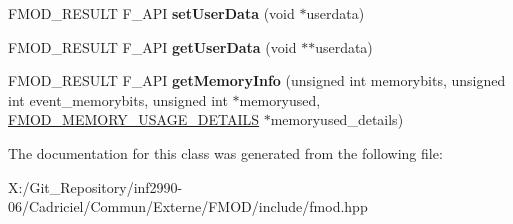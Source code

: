 \begin{DoxyCompactItemize}
\item 
\hypertarget{class_f_m_o_d_1_1_channel_a1ffb34925720c2fcc0afbcab0737df4e}{F\-M\-O\-D\-\_\-\-R\-E\-S\-U\-L\-T F\-\_\-\-A\-P\-I {\bfseries set\-User\-Data} (void $\ast$userdata)}\label{class_f_m_o_d_1_1_channel_a1ffb34925720c2fcc0afbcab0737df4e}

\item 
\hypertarget{class_f_m_o_d_1_1_channel_ab22d259b47802604e61c0e412d7e35f4}{F\-M\-O\-D\-\_\-\-R\-E\-S\-U\-L\-T F\-\_\-\-A\-P\-I {\bfseries get\-User\-Data} (void $\ast$$\ast$userdata)}\label{class_f_m_o_d_1_1_channel_ab22d259b47802604e61c0e412d7e35f4}

\item 
\hypertarget{class_f_m_o_d_1_1_channel_acefe95cb3e5096a5f01f253c2745bad3}{F\-M\-O\-D\-\_\-\-R\-E\-S\-U\-L\-T F\-\_\-\-A\-P\-I {\bfseries get\-Memory\-Info} (unsigned int memorybits, unsigned int event\-\_\-memorybits, unsigned int $\ast$memoryused, \hyperlink{struct_f_m_o_d___m_e_m_o_r_y___u_s_a_g_e___d_e_t_a_i_l_s}{F\-M\-O\-D\-\_\-\-M\-E\-M\-O\-R\-Y\-\_\-\-U\-S\-A\-G\-E\-\_\-\-D\-E\-T\-A\-I\-L\-S} $\ast$memoryused\-\_\-details)}\label{class_f_m_o_d_1_1_channel_acefe95cb3e5096a5f01f253c2745bad3}

\end{DoxyCompactItemize}


The documentation for this class was generated from the following file\-:\begin{DoxyCompactItemize}
\item 
X\-:/\-Git\-\_\-\-Repository/inf2990-\/06/\-Cadriciel/\-Commun/\-Externe/\-F\-M\-O\-D/include/fmod.\-hpp\end{DoxyCompactItemize}
